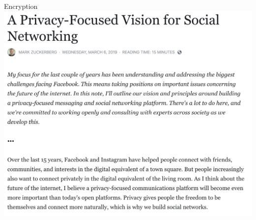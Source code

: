 \documentclass[nobackground,dvipsnames,table,aspectratio=169]{beamer}
\begin{document}
\begin{frame}{Encryption}
    \centering
    \includegraphics[height=0.8\textheight]{zuckerberg-privacy-article}
\end{frame}
\end{document}
